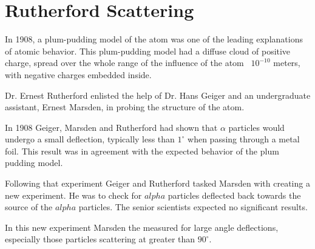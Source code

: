 \documentclass[12pt]{article}
\begin{document}
\maketitle



\section{Rutherford Scattering}

In 1908, a plum-pudding model of the atom was one of the leading explanations of atomic behavior.
This plum-pudding model had a diffuse cloud of positive charge, spread over the whole range of the influence of the atom ~$10^{-10}$ meters, with negative charges embedded inside. 

Dr. Ernest Rutherford enlisted the help of Dr. Hans Geiger and an undergraduate assistant, Ernest Marsden, in probing the structure of the atom.

In 1908 Geiger, Marsden and Rutherford had shown that $\alpha$ particles would undergo a small deflection, typically less than $1^\circ$ when passing through a metal foil\cite{Geiger1908}.
This result was in agreement with the expected behavior of the plum pudding model.

Following that experiment Geiger and Rutherford tasked Marsden with creating a new experiment.
He was to check for $alpha$ particles deflected back towards the source of the $alpha$ particles.
The senior scientists expected no significant results.

In this new experiment Marsden the measured for large angle deflections, especially those particles scattering at greater than $90^\circ$.
\end{document}
